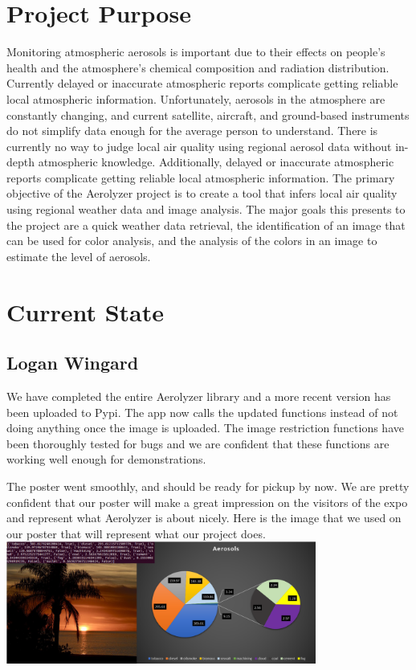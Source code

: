 \documentclass[onecolumn, draftclsnofoot,10pt, compsoc]{IEEEtran}
\begin{document}
\tableofcontents
\clearpage

\begin{singlespace}

	\section{Project Purpose}
		Monitoring atmospheric aerosols is important due to their effects on people’s health and the atmosphere's chemical composition and radiation distribution.
		Currently delayed or inaccurate atmospheric reports complicate getting reliable local atmospheric information.
		Unfortunately, aerosols in the atmosphere are constantly changing, and current satellite, aircraft, and ground-based instruments do not simplify data enough for the average person to understand.
		There is currently no way to judge local air quality using regional aerosol data without in-depth atmospheric knowledge.
		Additionally, delayed or inaccurate atmospheric reports complicate getting reliable local atmospheric information.
		The primary objective of the Aerolyzer project is to create a tool that infers local air quality using regional weather data and image analysis.
		The major goals this presents to the project are a quick weather data retrieval, the identification of an image that can be used for color analysis, and the analysis of the colors in an image to estimate the level of aerosols.
	
	\section{Current State}
		
		\subsection{Logan Wingard}
			We have completed the entire Aerolyzer library and a more recent version has been uploaded to Pypi. 
			The app now calls the updated functions instead of not doing anything once the image is uploaded.
			The image restriction functions have been thoroughly tested for bugs and we are confident that these functions are working well enough for demonstrations.

			The poster went smoothly, and should be ready for pickup by now.
			We are pretty confident that our poster will make a great impression on the visitors of the expo and represent what Aerolyzer is about nicely.
			Here is the image that we used on our poster that will represent what our project does.\\
			\includegraphics[height=4cm,natwidth=1098,natheight=432]{images/posterimg.png}

\end{singlespace}
\end{document}
